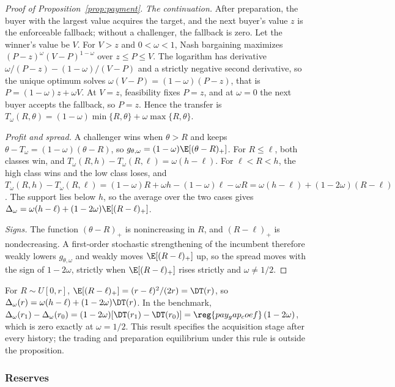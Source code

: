 \begin{proof}[Proof of Proposition~\ref{prop:payment}]
\emph{The continuation.} After preparation, the buyer with the largest value acquires the target, and the next
buyer's value \(z\) is the enforceable fallback; without a challenger, the fallback is zero. Let the winner's value be
\(V\). For \(V>z\) and \(0<\omega<1\), Nash bargaining maximizes \((P-z)^\omega(V-P)^{1-\omega}\) over \(z\le P\le V\).
The logarithm has derivative \(\omega/(P-z)-(1-\omega)/(V-P)\) and a strictly negative second derivative, so the
unique optimum solves \(\omega(V-P)=(1-\omega)(P-z)\), that is \(P=(1-\omega)z+\omega V\). At \(V=z\), feasibility
fixes \(P=z\), and at \(\omega=0\) the next buyer accepts the fallback, so \(P=z\). Hence the transfer is
\(T_\omega(R,\theta)=(1-\omega)\min\{R,\theta\}+\omega\max\{R,\theta\}\).

\emph{Profit and spread.} A challenger wins when \(\theta>R\) and keeps \(\theta-T_\omega=(1-\omega)(\theta-R)\), so
\(g_{\theta,\omega}=(1-\omega)\E[(\theta-R)_+]\). For \(R\le\ell\), both classes win, and
\(T_\omega(R,h)-T_\omega(R,\ell)=\omega(h-\ell)\). For \(\ell<R<h\), the high class wins and the low class loses, and
\(T_\omega(R,h)-T_\omega(R,\ell)=(1-\omega)R+\omega h-(1-\omega)\ell-\omega R=\omega(h-\ell)+(1-2\omega)(R-\ell)\). The
support lies below \(h\), so the average over the two cases gives
\(\Delta_\omega=\omega(h-\ell)+(1-2\omega)\E[(R-\ell)_+]\).

\emph{Signs.} The function \((\theta-R)_+\) is nonincreasing in \(R\), and \((R-\ell)_+\) is nondecreasing. A
first-order stochastic strengthening of the incumbent therefore weakly lowers \(g_{\theta,\omega}\) and weakly moves
\(\E[(R-\ell)_+]\) up, so the spread moves with the sign of \(1-2\omega\), strictly when \(\E[(R-\ell)_+]\) rises
strictly and \(\omega\ne1/2\).
\end{proof}

For \(R\sim U[0,r]\), \(\E[(R-\ell)_+]=(r-\ell)^2/(2r)=\DT(r)\), so \(\Delta_\omega(r)=\omega(h-\ell)+(1-2\omega)\DT(r)\).
In the benchmark, \(\Delta_\omega(r_1)-\Delta_\omega(r_0)=(1-2\omega)[\DT(r_1)-\DT(r_0)]=\reg{pay_gap_coef}\,(1-2\omega)\),
which is zero exactly at \(\omega=1/2\). This result specifies the acquisition stage after every history; the trading
and preparation equilibrium under this rule is outside the proposition.

\subsubsection*{Reserves}

